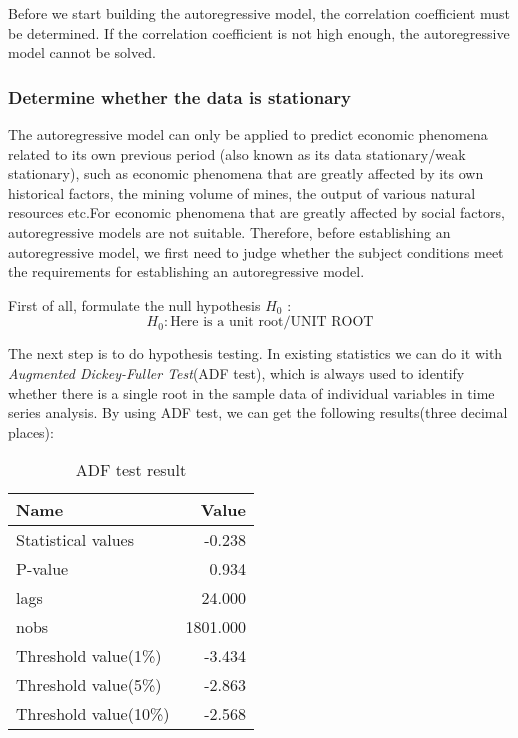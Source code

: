 \documentclass{mcmthesis}
\begin{document}
Before we start building the autoregressive model, the correlation coefficient must be determined. If the correlation coefficient is not high enough, the autoregressive model cannot be solved.

\subsubsection{Determine whether the data is stationary}
The autoregressive model can only be applied to predict economic phenomena related to its own previous period (also known as its data stationary/weak stationary), such as economic phenomena that are greatly affected by its own historical factors, the mining volume of mines, the output of various natural resources etc.For economic phenomena that are greatly affected by social factors, autoregressive models are not suitable. Therefore, before establishing an autoregressive model, we first need to judge whether the subject conditions meet the requirements for establishing an autoregressive model.

First of all, formulate the null hypothesis $H_0$ :
\[
 H_0 : \mbox{Here is a unit root/UNIT ROOT}
\]

The next step is to do hypothesis testing.
In existing statistics we can do it with \textit{Augmented Dickey-Fuller Test}(ADF test), which is always used to identify whether there is a single root in the sample data of individual variables in time series analysis.
By using ADF test, we can get the following results(three decimal places):

\begin{table}[H]
  \centering
  \begin{tabular}{@{}lr@{}}
    \toprule
    Name & Value \\
    \midrule
    Statistical values & -0.238 \\
    P-value & 0.934 \\
    lags & 24.000 \\
    nobs & 1801.000 \\
    Threshold value(1\%) & -3.434 \\
    Threshold value(5\%) & -2.863 \\
    Threshold value(10\%) & -2.568 \\
    \bottomrule
  \end{tabular}
  \caption{ADF test result}
\end{table}
\end{document}
